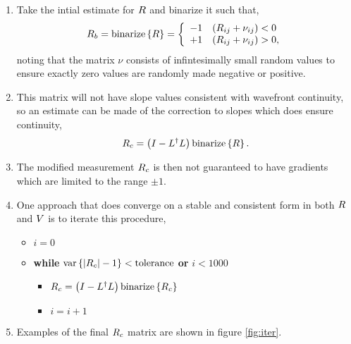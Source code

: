 \documentclass[a4paper]{article}
\begin{document}
\begin{enumerate}
   \item Take the intial estimate for $\mathnormal{R}$ and binarize it such that,
   \begin{equation*}
      \mathnormal{R}_b=\mathrm{binarize}\left\{\mathnormal{R}\right\}=
      \left\{ \begin{array}{ll}
         -1 & (R_{ij}+\nu_{ij}) < 0 \\
         +1 & (R_{ij}+\nu_{ij}) > 0,
         \end{array} \right.
   \end{equation*}
    noting that the matrix $\nu$ consists of infintesimally small random values
    to ensure exactly zero values are randomly made negative or positive.
   \item This matrix will not have slope values consistent with wavefront
   continuity, so an estimate can be made of the correction to slopes
   which does ensure continuity,
   \begin{equation*}
      \mathnormal{R}_c=\left(\mathnormal{I}-\mathnormal{L}^{\dagger}\mathnormal{L}\right)
         \mathrm{binarize}\left\{ \mathnormal{R} \right\}.
   \end{equation*}
   \item The modified measurement $\mathnormal{R}_c$ is then not guaranteed to have
   gradients which are limited to the range $\pm1$.
   \item One approach that does converge on a stable and consistent form in both
   $\mathnormal{R}$ and $\mathnormal{V}$ is to iterate this procedure,
   \begin{itemize}
      \item $i=0$
      \item \textbf{while}
       $\mbox{var}\left\{\left|\mathnormal{R}_c\right|-1\right\}<\mbox{tolerance}$
       \textbf{or} $i < 1000$
      \begin{itemize}
         \item $\mathnormal{R}_c=\left(\mathnormal{I}-\mathnormal{L}^{\dagger}
            \mathnormal{L}\right) \mathrm{binarize}\left\{ \mathnormal{R}_c \right\}$
         \item $i=i+1$
      \end{itemize}
   \end{itemize}
   \item Examples of the final $\mathnormal{R}_c$ matrix are shown in figure
     \ref{fig:iter}.
\end{enumerate}
\end{document}

